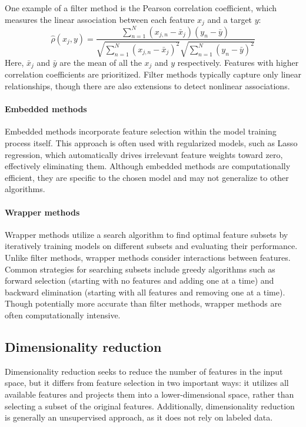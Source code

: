 One example of a filter method is the Pearson correlation coefficient, which measures the linear association between each feature $x_j$ and a target $y$: 
\[\hat{\rho}(x_j,y)=\dfrac{\sum_{n=1}^{N}(x_{j,n}-\bar{x}_j)(y_n-\bar{y})}{\sqrt{\sum_{n=1}^{N}(x_{j,n}-\bar{x}_j)^2}\sqrt{\sum_{n=1}^{N}(y_n-\bar{y})^2}}\]
Here, $\bar{x}_j$ and $\bar{y}$ are the mean of all the $x_j$ and $y$ respectively.
Features with higher correlation coefficients are prioritized. 
Filter methods typically capture only linear relationships, though there are also extensions to detect nonlinear associations.

\paragraph*{Embedded methods}
Embedded methods incorporate feature selection within the model training process itself. 
This approach is often used with regularized models, such as Lasso regression, which automatically drives irrelevant feature weights toward zero, effectively eliminating them.
Although embedded methods are computationally efficient, they are specific to the chosen model and may not generalize to other algorithms.

\paragraph*{Wrapper methods}
Wrapper methods utilize a search algorithm to find optimal feature subsets by iteratively training models on different subsets and evaluating their performance.
Unlike filter methods, wrapper methods consider interactions between features.
Common strategies for searching subsets include greedy algorithms such as forward selection (starting with no features and adding one at a time) and backward elimination (starting with all features and removing one at a time). 
Though potentially more accurate than filter methods, wrapper methods are often computationally intensive.

\subsection{Dimensionality reduction}
Dimensionality reduction seeks to reduce the number of features in the input space, but it differs from feature selection in two important ways: it utilizes all available features and projects them into a lower-dimensional space, rather than selecting a subset of the original features. 
Additionally, dimensionality reduction is generally an unsupervised approach, as it does not rely on labeled data.

